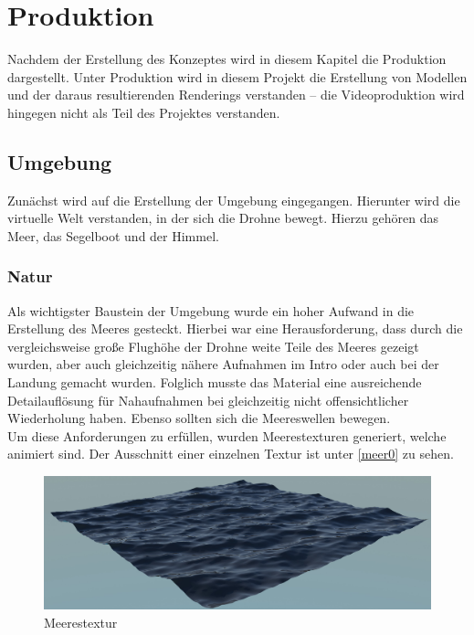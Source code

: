 \chapter{Produktion}
Nachdem der Erstellung des Konzeptes wird in diesem Kapitel die Produktion dargestellt. Unter Produktion wird in diesem Projekt die Erstellung von Modellen und der daraus resultierenden Renderings verstanden -- die Videoproduktion wird hingegen nicht als Teil des Projektes verstanden.

\section{Umgebung}

Zunächst wird auf die Erstellung der Umgebung eingegangen. Hierunter wird die virtuelle Welt verstanden, in der sich die Drohne bewegt. Hierzu gehören das Meer, das Segelboot und der Himmel.

\subsection{Natur}

Als wichtigster Baustein der Umgebung wurde ein hoher Aufwand in die Erstellung des Meeres gesteckt. Hierbei war eine Herausforderung, dass durch die vergleichsweise große Flughöhe der Drohne weite Teile des Meeres gezeigt wurden, aber auch gleichzeitig nähere Aufnahmen im Intro oder auch bei der Landung gemacht wurden. Folglich musste das Material eine ausreichende Detailauflösung für Nahaufnahmen bei gleichzeitig nicht offensichtlicher Wiederholung haben. Ebenso sollten sich die Meereswellen bewegen.\\
Um diese Anforderungen zu erfüllen, wurden Meerestexturen generiert, welche animiert sind. Der Ausschnitt einer einzelnen Textur ist unter \autoref{meer0} zu sehen. 

\begin{figure}[H]
\includegraphics[width=\textwidth]{gfx/prod/ocean/meer0.jpg}
\caption{Meerestextur}
\label{meer0}
\end{figure}


